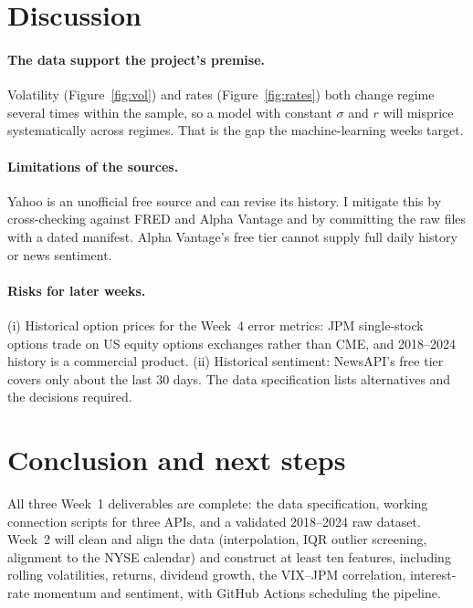 \documentclass[11pt]{article}
\begin{document}
\section{Discussion}
\paragraph{The data support the project's premise.} Volatility (Figure~\ref{fig:vol}) and rates
(Figure~\ref{fig:rates}) both change regime several times within the sample, so a model with constant $\sigma$ and
$r$ will misprice systematically across regimes. That is the gap the machine-learning weeks target.

\paragraph{Limitations of the sources.} Yahoo is an unofficial free source and can revise its history. I mitigate
this by cross-checking against FRED and Alpha Vantage and by committing the raw files with a dated manifest. Alpha
Vantage's free tier cannot supply full daily history or news sentiment.

\paragraph{Risks for later weeks.} (i) Historical option prices for the Week~4 error metrics: JPM single-stock
options trade on US equity options exchanges rather than CME, and 2018--2024 history is a commercial product.
(ii) Historical sentiment: NewsAPI's free tier covers only about the last 30 days. The data specification lists
alternatives and the decisions required.

\section{Conclusion and next steps}
All three Week~1 deliverables are complete: the data specification, working connection scripts for three APIs, and
a validated 2018--2024 raw dataset. Week~2 will clean and align the data (interpolation, IQR outlier screening,
alignment to the NYSE calendar) and construct at least ten features, including rolling volatilities, returns,
dividend growth, the VIX--JPM correlation, interest-rate momentum and sentiment, with GitHub Actions scheduling the
pipeline.
\end{document}
